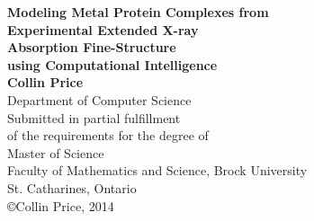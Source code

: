 \begin{titlepage}
\begin{center}

{\LARGE {\bf Modeling Metal Protein Complexes from}}
\\[0.2cm]{\LARGE {\bf Experimental Extended X-ray }}
\\[0.2cm]{\LARGE {\bf Absorption Fine-Structure}}
\\[0.2cm]{\LARGE {\bf using Computational Intelligence}}
\\[3cm]
{\Large{ \bf Collin Price}}
\\[0.5cm]
{\large Department of Computer Science}
\\[3cm]
{\large Submitted in partial fulfillment\\
of the requirements for the degree of}
\\[1cm]
{\large Master of Science}
\\[1cm]
{\large Faculty of Mathematics and Science, Brock University\\
St. Catharines, Ontario}
\\[4cm]
\copyright Collin Price, 2014

\end{center}
\end{titlepage}

